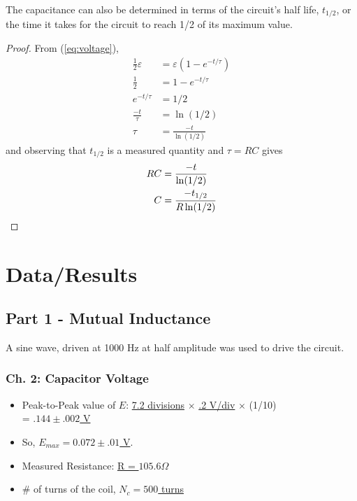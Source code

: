 \documentclass[twocolumn,english]{IEEEtran}
\theoremstyle{plain}
\theoremstyle{plain}
\begin{document}
The capacitance can also be determined in terms of the circuit's half life, $t_{1/2}$, or the time it takes for the circuit to reach 1/2 of its maximum value.

\begin{proof}
	From (\ref{eq:voltage}),
	\begin{align*}
		\frac{1}{2}\varepsilon &= \varepsilon(1-e^{-t/\tau}) \\
		\frac{1}{2} &= 1 - e^{-t/\tau} \\
		e^{-t/\tau} &= 1/2 \\
		\frac{-t}{\tau} &= \ln(1/2) \\
		\tau &= \frac{-t}{\ln(1/2)}
	\end{align*}
	and observing that $t_{1/2}$ is a measured quantity and $\tau = RC$ gives
	\begin{align}
	RC &= \frac{-t}{\ln(1/2)} \notag \\
	C  &= \frac{-t_{1/2}}{R\ln(1/2)}
	\end{align}

\end{proof}



\section{Data/Results}
\subsection{Part 1 - Mutual Inductance}
A sine wave, driven at 1000 Hz at half amplitude was used to drive the circuit.

\subsubsection{Ch. 2: Capacitor Voltage}

\begin{itemize}
\item Peak-to-Peak value of $E$:
\underline{7.2 divisions} $\times$ \underline{.2 V/div} $\times$ (1/10) \\ \hfill = \underline{ $.144\pm .002$ V}

\item So, \hfill \underline{$E_{max} =0.072 \pm .01$ V}.

\item Measured Resistance: \hfill \underline{R = $105.6\Omega$}

\item \# of turns of the coil, \hfill\underline{$N_c = 500$ turns}\\
\end{itemize}
\end{document}
